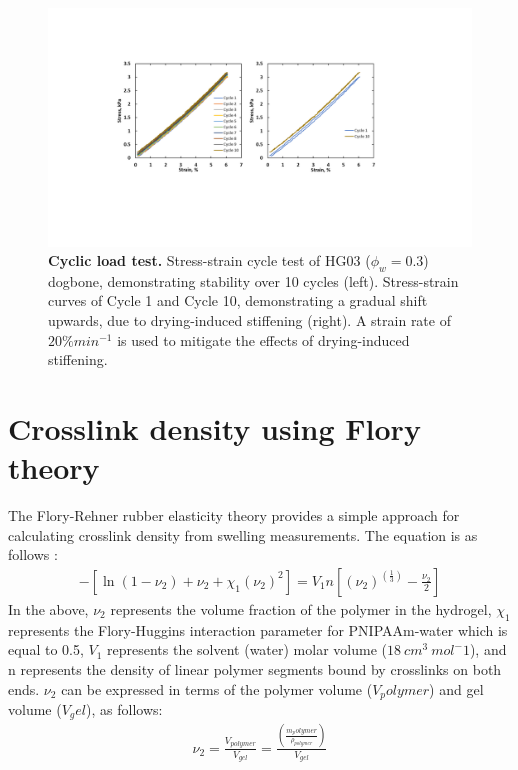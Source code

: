\begin{figure}[!th]
      \centering
      \includegraphics[width=\textwidth]{stressCycle.pdf}
      \caption[Cyclic load test]{\textbf{Cyclic load test.} Stress-strain cycle test of HG03 ($\phi_{w}=0.3$) dogbone, demonstrating stability over 10 cycles (left). Stress-strain curves of Cycle 1 and Cycle 10, demonstrating a gradual shift upwards, due to drying-induced stiffening (right). A strain rate of $20\% min^{-1}$ is used to mitigate the effects of drying-induced stiffening.}
      \label{fig:stressCycle}
\end{figure}

\section{Crosslink density using Flory theory}
The Flory-Rehner rubber elasticity theory provides a simple approach for calculating crosslink density from swelling measurements. The equation is as follows :
\begin{align}
	-[\ln⁡(1-\nu_2)+\nu_2+\chi_1 (\nu_2 )^2 ]=V_1 n[(\nu_2 )^{(\frac{1}{3})}-\frac{\nu_2}{2}]
\end{align}
In the above, $\nu_{2}$ represents the volume fraction of the polymer in the hydrogel, $\chi_{1}$  represents the Flory-Huggins interaction parameter for PNIPAAm-water  which is equal to 0.5,  $V_{1}$ represents the solvent (water) molar volume ($18~cm^3~mol^-1$), and n represents the density of linear polymer segments bound by crosslinks on both ends. $\nu_{2}$ can be expressed in terms of the polymer volume ($V_polymer$) and gel volume ($V_gel$), as follows:
\begin{align}
	\nu_2=\frac{V_{polymer}}{V_{gel}} =\frac{(\frac{{m_polymer}}{\rho_{polymer}})}{V_{gel}} 
\end{align}

